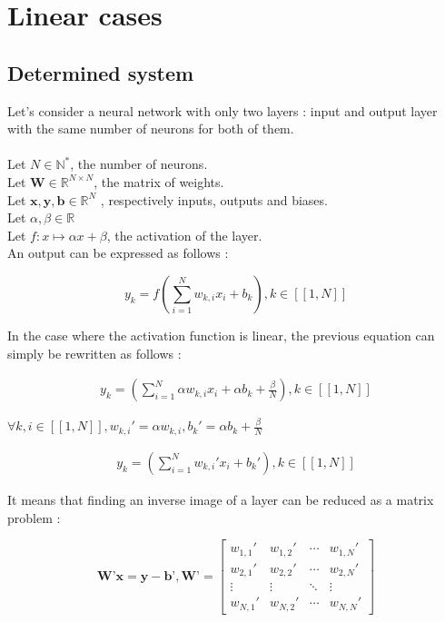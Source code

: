 \documentclass{article}
\begin{document}
\section{Linear cases}

\subsection{Determined system}
Let’s consider a neural network with only two layers : input and output layer with the same number of neurons for both of them.\\
\\
Let $ N \in \mathbb{N^{*}}$, the number of neurons.\\
Let $\textbf{W}\in \mathbb{R}^{N \times N}$, the matrix of weights.\\
Let $\textbf{x},\textbf{y},\textbf{b} \in \mathbb{R}^{N}$ , respectively inputs, outputs and biases.\\
Let $\alpha,\beta \in \mathbb{R}$\\
Let $f:x \mapsto \alpha x + \beta $, the activation of the layer.\\
An output can be expressed as follows : 

\[y_{k} = f(\sum_{i=1}^{N} w_{k,i}x_{i} + b_{k}) ,  k \in [\![1,N]\!] \]

In the case where the activation function is linear, the previous equation can simply be rewritten as follows :

\begin{align}
    y_{k} = (\sum_{i=1}^{N} \alpha w_{k,i}x_{i} + \alpha b_{k} + \frac{\beta}{N} ),  k \in [\![1,N]\!] 
\end{align}

$\forall k,i \in [\![1,N]\!],w_{k,i}'=\alpha w_{k,i},b_{k}'=\alpha b_{k} + \frac{\beta}{N} $

\begin{align*}
    y_{k} = (\sum_{i=1}^{N}  w_{k,i}'x_{i} +  b_{k}' ),  k \in [\![1,N]\!] 
\end{align*}

It means that finding an inverse image of a layer can be reduced as a matrix problem : 

\begin{equation}
    \textbf{W'}\textbf{x}=\textbf{y}-\textbf{b'},\textbf{W'}= 
    \begin{bmatrix}
    w_{1,1}' & w_{1,2}' & \cdots & w_{1,N}' \\
    w_{2,1}' & w_{2,2}' & \cdots & w_{2,N}' \\
    \vdots  & \vdots  & \ddots & \vdots  \\
    w_{N,1}' & w_{N,2}' & \cdots & w_{N,N}' 
    \end{bmatrix}
    \end{equation}
\end{document}
